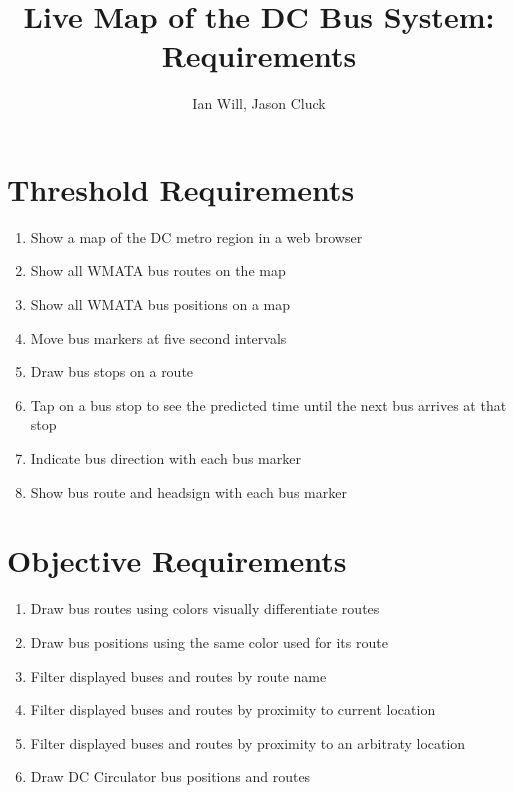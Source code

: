 \documentclass[12pt]{article}
\title{Live Map of the DC Bus System: Requirements}
\author{Ian Will, Jason Cluck}
\date{}
\begin{document}
\maketitle


\section*{Threshold Requirements}
\begin{enumerate}
\item Show a map of the DC metro region in a web browser
\item Show all WMATA bus routes on the map
\item Show all WMATA bus positions on a map
\item Move bus markers at five second intervals
\item Draw bus stops on a route
\item Tap on a bus stop to see the predicted time until the next bus arrives at that stop
\item Indicate bus direction with each bus marker
\item Show bus route and headsign with each bus marker
\end{enumerate}

\section*{Objective Requirements}
\begin{enumerate}
\item Draw bus routes using colors visually differentiate routes
\item Draw bus positions using the same color used for its route
\item Filter displayed buses and routes by route name
\item Filter displayed buses and routes by proximity to current location
\item Filter displayed buses and routes by proximity to an arbitraty location 
\item Draw DC Circulator bus positions and routes
\end{enumerate}
\end{document}

